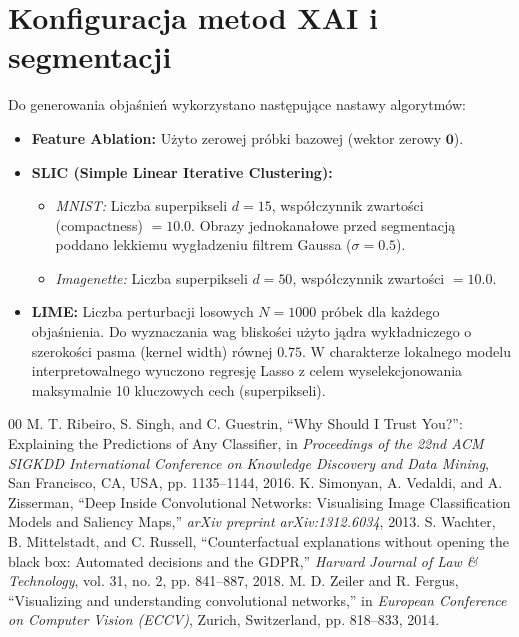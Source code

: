 \documentclass[10pt,journal,compsoc]{IEEEtran}
\begin{document}
\section{Konfiguracja metod XAI i segmentacji}
Do generowania objaśnień wykorzystano następujące nastawy algorytmów:
\begin{itemize}
    \item \textbf{Feature Ablation:} Użyto zerowej próbki bazowej (wektor zerowy $\mathbf{0}$).
    \item \textbf{SLIC (Simple Linear Iterative Clustering):}
    \begin{itemize}
        \item \textit{MNIST:} Liczba superpikseli $d = 15$, współczynnik zwartości (compactness) $= 10.0$. Obrazy jednokanałowe przed segmentacją poddano lekkiemu wygładzeniu filtrem Gaussa ($\sigma = 0.5$).
        \item \textit{Imagenette:} Liczba superpikseli $d = 50$, współczynnik zwartości $= 10.0$.
    \end{itemize}
    \item \textbf{LIME:} Liczba perturbacji losowych $N = 1000$ próbek dla każdego objaśnienia. Do wyznaczania wag bliskości użyto jądra wykładniczego o szerokości pasma (kernel width) równej $0.75$. W charakterze lokalnego modelu interpretowalnego wyuczono regresję Lasso z celem wyselekcjonowania maksymalnie 10 kluczowych cech (superpikseli).
\end{itemize}

\begin{thebibliography}{00}
 M. T. Ribeiro, S. Singh, and C. Guestrin, ``Why Should I Trust You?'': Explaining the Predictions of Any Classifier, in \textit{Proceedings of the 22nd ACM SIGKDD International Conference on Knowledge Discovery and Data Mining}, San Francisco, CA, USA, pp. 1135--1144, 2016.
 K. Simonyan, A. Vedaldi, and A. Zisserman, ``Deep Inside Convolutional Networks: Visualising Image Classification Models and Saliency Maps,'' \textit{arXiv preprint arXiv:1312.6034}, 2013.
 S. Wachter, B. Mittelstadt, and C. Russell, ``Counterfactual explanations without opening the black box: Automated decisions and the GDPR,'' \textit{Harvard Journal of Law \& Technology}, vol. 31, no. 2, pp. 841--887, 2018.
 M. D. Zeiler and R. Fergus, ``Visualizing and understanding convolutional networks,'' in \textit{European Conference on Computer Vision (ECCV)}, Zurich, Switzerland, pp. 818--833, 2014.
\end{thebibliography}

\end{document}

